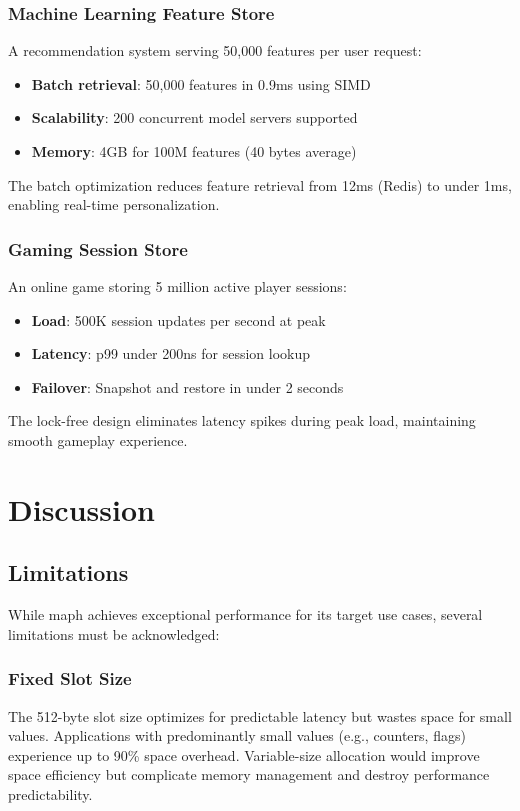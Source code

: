 \documentclass[11pt]{article}
\begin{document}
\subsubsection{Machine Learning Feature Store}
A recommendation system serving 50,000 features per user request:

\begin{itemize}
\item \textbf{Batch retrieval}: 50,000 features in 0.9ms using SIMD
\item \textbf{Scalability}: 200 concurrent model servers supported
\item \textbf{Memory}: 4GB for 100M features (40 bytes average)
\end{itemize}

The batch optimization reduces feature retrieval from 12ms (Redis) to under 1ms, enabling real-time personalization.

\subsubsection{Gaming Session Store}
An online game storing 5 million active player sessions:

\begin{itemize}
\item \textbf{Load}: 500K session updates per second at peak
\item \textbf{Latency}: p99 under 200ns for session lookup
\item \textbf{Failover}: Snapshot and restore in under 2 seconds
\end{itemize}

The lock-free design eliminates latency spikes during peak load, maintaining smooth gameplay experience.

\section{Discussion}
\label{sec:discussion}

\subsection{Limitations}

While maph achieves exceptional performance for its target use cases, several limitations must be acknowledged:

\subsubsection{Fixed Slot Size}
The 512-byte slot size optimizes for predictable latency but wastes space for small values. Applications with predominantly small values (e.g., counters, flags) experience up to 90\% space overhead. Variable-size allocation would improve space efficiency but complicate memory management and destroy performance predictability.
\end{document}
